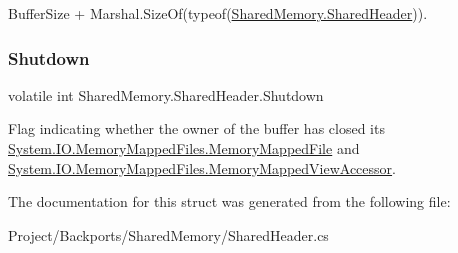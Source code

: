 {\ttfamily Buffer\+Size + Marshal.\+Size\+Of(typeof(\hyperlink{struct_shared_memory_1_1_shared_header}{Shared\+Memory.\+Shared\+Header}))}. \mbox{\label{struct_shared_memory_1_1_shared_header_a322c651d49080ce9021fed3e79aeee5b}} 
\subsubsection{\texorpdfstring{Shutdown}{Shutdown}}
{\footnotesize\ttfamily volatile int Shared\+Memory.\+Shared\+Header.\+Shutdown}



Flag indicating whether the owner of the buffer has closed its \hyperlink{class_system_1_1_i_o_1_1_memory_mapped_files_1_1_memory_mapped_file}{System.\+I\+O.\+Memory\+Mapped\+Files.\+Memory\+Mapped\+File} and \hyperlink{class_system_1_1_i_o_1_1_memory_mapped_files_1_1_memory_mapped_view_accessor}{System.\+I\+O.\+Memory\+Mapped\+Files.\+Memory\+Mapped\+View\+Accessor}. 



The documentation for this struct was generated from the following file\+:\begin{DoxyCompactItemize}
\item 
Project/\+Backports/\+Shared\+Memory/Shared\+Header.\+cs\end{DoxyCompactItemize}
